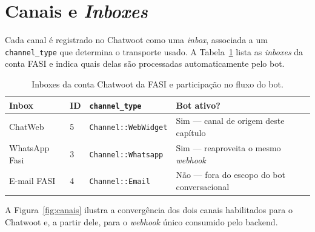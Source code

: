 \documentclass[12pt,a4paper]{report}
\begin{document}
\section{Canais e \textit{Inboxes}}

Cada canal é registrado no Chatwoot como uma \textit{inbox}, associada a um
\texttt{channel\_type} que determina o transporte usado. A
Tabela~\ref{tab:inboxes} lista as \textit{inboxes} da conta FASI e indica
quais delas são processadas automaticamente pelo bot.

\begin{table}[H]
\centering
\small
\begin{tabularx}{\textwidth}{lllX}
\toprule
\textbf{Inbox} & \textbf{ID} & \textbf{\texttt{channel\_type}} & \textbf{Bot ativo?} \\
\midrule
ChatWeb       & 5 & \texttt{Channel::WebWidget} & Sim --- canal de origem deste capítulo \\
WhatsApp Fasi & 3 & \texttt{Channel::Whatsapp}  & Sim --- reaproveita o mesmo \textit{webhook} \\
E-mail FASI   & 4 & \texttt{Channel::Email}     & Não --- fora do escopo do bot conversacional \\
\bottomrule
\end{tabularx}
\caption{Inboxes da conta Chatwoot da FASI e participação no fluxo do bot.}
\label{tab:inboxes}
\end{table}

A Figura~\ref{fig:canais} ilustra a convergência dos dois canais habilitados
para o Chatwoot e, a partir dele, para o \textit{webhook} único consumido
pelo backend.
\end{document}

